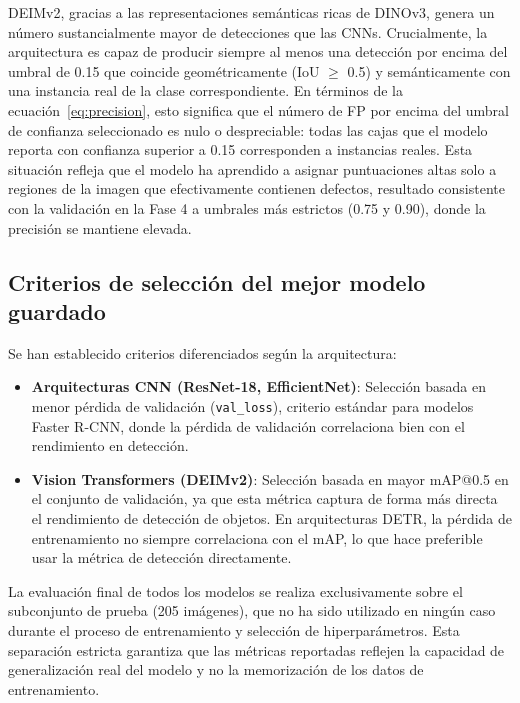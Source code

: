DEIMv2, gracias a las representaciones semánticas ricas de DINOv3, genera un número sustancialmente mayor de detecciones que las CNNs. Crucialmente, la arquitectura es capaz de producir siempre al menos una detección por encima del umbral de 0.15 que coincide geométricamente (IoU $\geq$ 0.5) y semánticamente con una instancia real de la clase correspondiente. En términos de la ecuación~\eqref{eq:precision}, esto significa que el número de \acrshort{FP} por encima del umbral de confianza seleccionado es nulo o despreciable: todas las cajas que el modelo reporta con confianza superior a 0.15 corresponden a instancias reales. Esta situación refleja que el modelo ha aprendido a asignar puntuaciones altas solo a regiones de la imagen que efectivamente contienen defectos, resultado consistente con la validación en la Fase 4 a umbrales más estrictos (0.75 y 0.90), donde la precisión se mantiene elevada.

\subsection{Criterios de selección del mejor modelo guardado}

Se han establecido criterios diferenciados según la arquitectura:

\begin{itemize}
    \item \textbf{Arquitecturas CNN (ResNet-18, EfficientNet)}: Selección basada en menor pérdida de validación (\texttt{val\_loss}), criterio estándar para modelos Faster R-CNN, donde la pérdida de validación correlaciona bien con el rendimiento en detección.
    \item \textbf{Vision Transformers (DEIMv2)}: Selección basada en mayor mAP@0.5 en el conjunto de validación, ya que esta métrica captura de forma más directa el rendimiento de detección de objetos. En arquitecturas DETR, la pérdida de entrenamiento no siempre correlaciona con el mAP, lo que hace preferible usar la métrica de detección directamente.
\end{itemize}

La evaluación final de todos los modelos se realiza exclusivamente sobre el subconjunto de prueba (205 imágenes), que no ha sido utilizado en ningún caso durante el proceso de entrenamiento y selección de hiperparámetros. Esta separación estricta garantiza que las métricas reportadas reflejen la capacidad de generalización real del modelo y no la memorización de los datos de entrenamiento.


